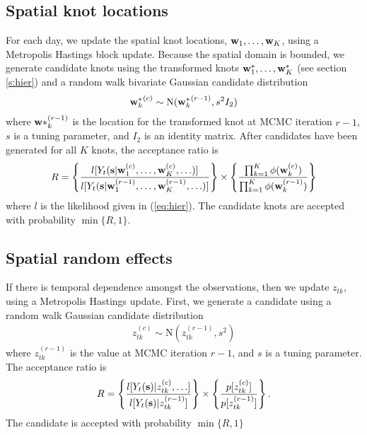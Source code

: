 \documentclass[11pt]{article}
\begin{document}
\subsection*{Spatial knot locations}
For each day, we update the spatial knot locations, $\mbox{\bf w}_1, \ldots, \mbox{\bf w}_K$, using a Metropolis Hastings block update.
Because the spatial domain is bounded, we generate candidate knots using the transformed knots $\mbox{\bf w}^*_1, \ldots, \mbox{\bf w}^*_K$ (see section \ref{s:hier}) and a random walk bivariate Gaussian candidate distribution
\begin{align*}
	{ \mbox{\bf w}^*_k}^{(c)} \sim \text{N}({\mbox{\bf w}^*_k}^{(r - 1)}, s^2 I_2)
\end{align*}
where $\mbox{\bf w}*_k^{(r - 1)}$ is the location for the transformed knot at MCMC iteration $r - 1$, $s$ is a tuning parameter, and $I_2$ is an identity matrix.
After candidates have been generated for all $K$ knots, the acceptance ratio is
\begin{align*}
  R = \left\{ \frac{ l[ Y_t(\mbox{\bf s} | \mbox{\bf w}_1^{(c)}, \ldots, \mbox{\bf w}_K^{(c)}, \ldots)] }{l[ Y_t(\mbox{\bf s} | \mbox{\bf w}_1^{(r - 1)}, \ldots, \mbox{\bf w}_K^{(r - 1)}, \ldots)]} \right\} \times \left\{ \frac{ \prod_{k = 1}^{K}\phi(\mbox{\bf w}_k^{(c)})}{ \prod_{k = 1}^{K}\phi(\mbox{\bf w}_k^{(r - 1)})} \right\}
\end{align*}
where $l$ is the likelihood given in (\ref{eq:hier}).
The candidate knots are accepted with probability $\min\{R, 1\}$.

\subsection*{Spatial random effects}
If there is temporal dependence amongst the observations, then we update $z_{tk}$, using a Metropolis Hastings update.
First, we generate a candidate using a random walk Gaussian candidate distribution
\begin{align*}
  z_{tk}^{(c)} \sim \text{N}(z_{tk}^{(r - 1)}, s^2)
\end{align*}
where $z_{tk}^{(r-1)}$ is the value at MCMC iteration $r - 1$, and $s$ is a tuning parameter.
The acceptance ratio is
\begin{align*}
  R = \left\{ \frac{ l[Y_t(\mbox{\bf s}) | z_{tk}^{(c)}, \ldots] }{ l[Y_t(\mbox{\bf s}) | z_{tk}^{(r - 1)}]} \right\} \times \left\{ \frac{ p[ z_{tk}^{(c)} ] }{ p[ z_{tk}^{(r - 1)}]}\right\}.
\end{align*}
The candidate is accepted with probability $\min\{R, 1\}$
\end{document}
